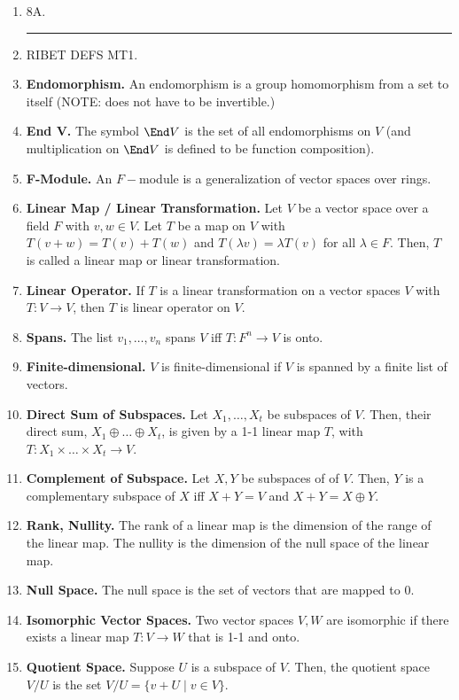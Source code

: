 \begin{enumerate}
	\item 8A. 
	\begin{center}
		\hrule
	\end{center} 
	\item RIBET DEFS MT1. 
	\item \textbf{Endomorphism. } An endomorphism is a group homomorphism from a set to itself (NOTE: does not have to be invertible.)
    \item \textbf{End V. } The symbol $\End V$ is the set of all endomorphisms on $V$ (and multiplication on $\End V$ is defined to be function composition). 
    \item \textbf{F-Module. } An $F-$module is a generalization of vector spaces over rings. 
    \item \textbf{Linear Map / Linear Transformation. } Let $V$ be a vector space over a field $F$ with $v,w \in V$. Let $T$ be a map on $V$ with $T(v+w) = T(v) + T(w)$ and $T(\lambda v) = \lambda T(v)$ for all $\lambda \in F$. Then, $T$ is called a linear map or linear transformation. 
    \item \textbf{Linear Operator. } If $T$ is a linear transformation on a vector spaces $V$ with $T: V \to V$, then $T$ is linear operator on $V$. 
    \item \textbf{Spans. } The list $v_1,\dots,v_n$ spans $V$ iff $T: F^n \to V$ is onto. 
        \item \textbf{Finite-dimensional. } $V$ is finite-dimensional if $V$ is spanned by a finite list of vectors. 
      \item \textbf{Direct Sum of Subspaces. } Let $X_1,\dots,X_t$ be subspaces of $V$. Then, their direct sum, $X_1 \oplus \dots \oplus X_t$, is given by a 1-1 linear map $T$, with $T: X_1\times \dots \times X_t \to V$.
	\item \textbf{Complement of Subspace. } Let $X,Y$ be subspaces of of $V$. Then, $Y$ is a complementary subspace of $X$ iff $X+Y=V$ and $X+Y = X \oplus Y$. 
	\item \textbf{Rank, Nullity. } The rank of a linear map is the dimension of the range of the linear map. The nullity is the dimension of the null space of the linear map. 
	\item \textbf{Null Space. } The null space is the set of vectors that are mapped to $0$. 
	\item \textbf{Isomorphic Vector Spaces. } Two vector spaces $V, W$ are isomorphic if there exists a linear map $T: V \to W$ that is 1-1 and onto. 
	\item \textbf{Quotient Space. } Suppose $U$ is a subspace of $V$. Then, the quotient space $V / U$ is the set $V / U = \{v + U \mid v \in V\}$. 

\end{enumerate}
